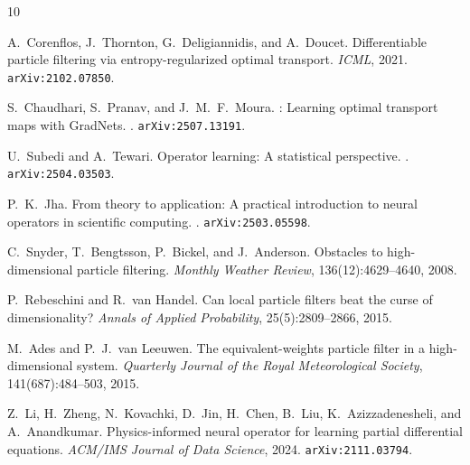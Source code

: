 \documentclass[11pt]{article}
\begin{document}
\begin{thebibliography}{10}

A.~Corenflos, J.~Thornton, G.~Deligiannidis, and A.~Doucet.
\newblock Differentiable particle filtering via entropy-regularized optimal transport.
\newblock \emph{ICML}, 2021. \texttt{arXiv:2102.07850}.

S.~Chaudhari, S.~Pranav, and J.~M.~F.~Moura.
: Learning optimal transport maps with {GradNets}.
. \texttt{arXiv:2507.13191}.

U.~Subedi and A.~Tewari.
\newblock Operator learning: A statistical perspective.
. \texttt{arXiv:2504.03503}.

P.~K.~Jha.
\newblock From theory to application: A practical introduction to neural operators in scientific computing.
. \texttt{arXiv:2503.05598}.

C.~Snyder, T.~Bengtsson, P.~Bickel, and J.~Anderson.
\newblock Obstacles to high-dimensional particle filtering.
\newblock \emph{Monthly Weather Review}, 136(12):4629--4640, 2008.

P.~Rebeschini and R.~van Handel.
\newblock Can local particle filters beat the curse of dimensionality?
\newblock \emph{Annals of Applied Probability}, 25(5):2809--2866, 2015.

M.~Ades and P.~J.~van Leeuwen.
\newblock The equivalent-weights particle filter in a high-dimensional system.
\newblock \emph{Quarterly Journal of the Royal Meteorological Society}, 141(687):484--503, 2015.

Z.~Li, H.~Zheng, N.~Kovachki, D.~Jin, H.~Chen, B.~Liu, K.~Azizzadenesheli, and A.~Anandkumar.
\newblock Physics-informed neural operator for learning partial differential equations.
\newblock \emph{ACM/IMS Journal of Data Science}, 2024. \texttt{arXiv:2111.03794}.

\end{thebibliography}
\end{document}
